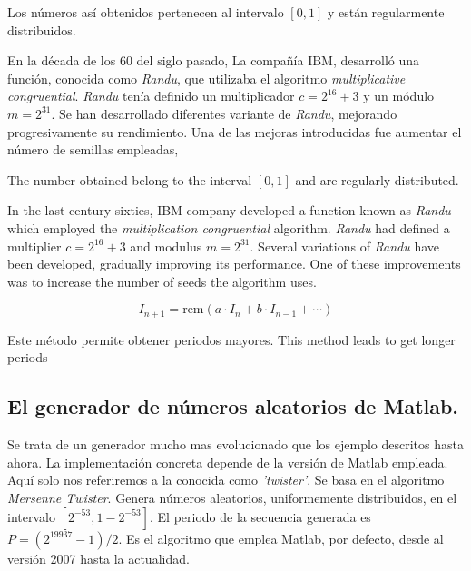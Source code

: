 \begin{paracol}{2}
Los números así obtenidos pertenecen al intervalo $[0,1]$ y están regularmente distribuidos. 

En la década de los 60 del siglo pasado, La compañía IBM, desarrolló una función, conocida como \emph{Randu}, que utilizaba el algoritmo \emph{multiplicative congruential}. \emph{Randu} tenía definido un multiplicador $c=2^{16}+3$ y un módulo $m=2^{31}$. 
Se han desarrollado diferentes variante de \emph{Randu}, mejorando progresivamente su rendimiento. Una de las mejoras introducidas fue aumentar el número de semillas empleadas,

\switchcolumn
The number obtained belong to the interval $[0,1]$ and are regularly distributed.

In the last century sixties, IBM company developed a function known as \emph{Randu} which employed the \emph{multiplication congruential} algorithm. \emph{Randu} had defined a multiplier $c=2^{16}+3$ and modulus $m=2^{31}$.
Several variations of \emph{Randu} have been developed, gradually improving its performance. One of these improvements was to increase the number of seeds the algorithm uses.  
\end{paracol}
\begin{equation*}
I_{n+1}=\text{rem}(a\cdot I_n+b\cdot I_{n-1}+\cdots)
\end{equation*} 
\begin{paracol}{2}
Este método permite obtener periodos mayores.
\switchcolumn
This method leads to get longer periods
\end{paracol}

\subsection{El generador de números aleatorios de Matlab.}\label{rand} Se trata de un generador mucho mas evolucionado que los ejemplo descritos hasta ahora.  La implementación concreta depende de la versión de Matlab empleada. Aquí solo nos referiremos a la conocida como \emph{'twister'}. Se basa en el algoritmo \emph{Mersenne Twister}. Genera números aleatorios, uniformemente distribuidos, en el intervalo $[2^{-53}, 1-2^{-53}] $. El periodo de la secuencia generada es $P=(2^{19937}-1)/2$. Es el algoritmo que emplea Matlab, por defecto, desde al versión 2007 hasta la actualidad.

